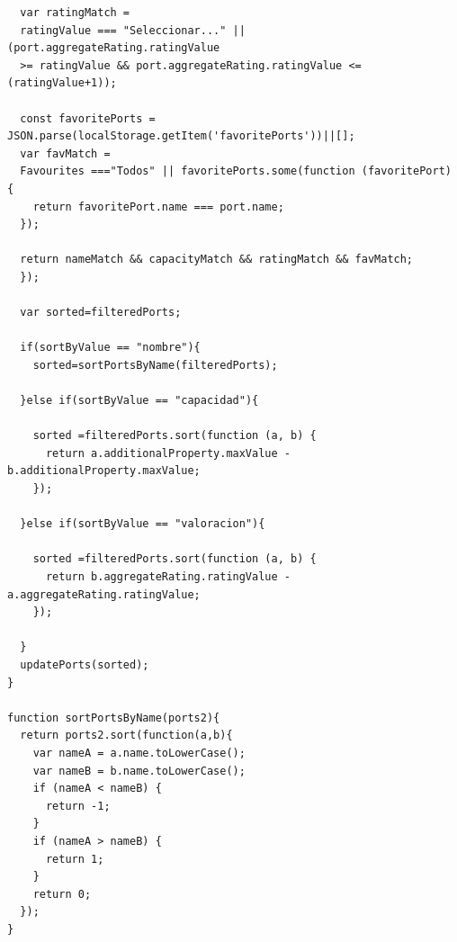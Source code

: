 \documentclass{article}
\begin{document}
\begin{itemize}
\begin{verbatim}
  var ratingMatch =
  ratingValue === "Seleccionar..." || (port.aggregateRating.ratingValue 
  >= ratingValue && port.aggregateRating.ratingValue <= (ratingValue+1));

  const favoritePorts = JSON.parse(localStorage.getItem('favoritePorts'))||[];
  var favMatch = 
  Favourites ==="Todos" || favoritePorts.some(function (favoritePort) {
    return favoritePort.name === port.name;
  });

  return nameMatch && capacityMatch && ratingMatch && favMatch;
  });

  var sorted=filteredPorts;

  if(sortByValue == "nombre"){
    sorted=sortPortsByName(filteredPorts);

  }else if(sortByValue == "capacidad"){

    sorted =filteredPorts.sort(function (a, b) {
      return a.additionalProperty.maxValue - b.additionalProperty.maxValue;
    });

  }else if(sortByValue == "valoracion"){

    sorted =filteredPorts.sort(function (a, b) {
      return b.aggregateRating.ratingValue - a.aggregateRating.ratingValue;
    });

  }
  updatePorts(sorted);
}

function sortPortsByName(ports2){
  return ports2.sort(function(a,b){
    var nameA = a.name.toLowerCase();
    var nameB = b.name.toLowerCase();
    if (nameA < nameB) {
      return -1;
    }
    if (nameA > nameB) {
      return 1;
    }
    return 0;
  });
}
    \end{verbatim}
\end{itemize}
\end{document}

